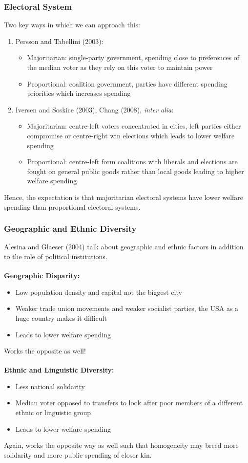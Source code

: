 \documentclass[12pt, letterpaper]{article}
\begin{document}
\subsubsection{Electoral System}
Two key ways in which we can approach this:
\begin{enumerate}
	\item Persson and Tabellini (2003):
		\begin{itemize}
			\item Majoritarian: single-party government, spending close to preferences of the median voter as they rely on this voter to maintain power
			\item Proportional: coalition government, parties have different spending priorities which increases spending
		\end{itemize}
	\item Iversen and Soskice (2003), Chang (2008), \textit{inter alia}:
		\begin{itemize}
			\item Majoritarian: centre-left voters concentrated in cities, left parties either compromise or centre-right win elections which leads to lower welfare spending
			\item Proportional: centre-left form coalitions with liberals and elections are fought on general public goods rather than local goods leading to higher welfare spending
		\end{itemize}
\end{enumerate}
Hence, the expectation is that majoritarian electoral systems have lower welfare spending than proportional electoral systems.

\subsubsection{Geographic and Ethnic Diversity}
Alesina and Glaeser (2004) talk about geographic and ethnic factors in addition to the role of political institutions.\\\\
\textbf{Geographic Disparity:}
\begin{itemize}
	\item Low population density and capital not the biggest city
	\item Weaker trade union movements and weaker socialist parties, the USA as a huge country makes it difficult
	\item Leads to lower welfare spending
\end{itemize}
Works the opposite as well!\\\\
\textbf{Ethnic and Linguistic Diversity:}
\begin{itemize}
	\item Less national solidarity
	\item Median voter opposed to transfers to look after poor members of a different ethnic or linguistic group
	\item Leads to lower welfare spending
\end{itemize}
Again, works the opposite way as well such that homogeneity may breed more solidarity and more public spending of closer kin.
\end{document}
